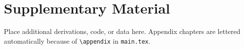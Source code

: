 ﻿%
\chapter{Supplementary Material}
\label{app:supplementary-material}

Place additional derivations, code, or data here. Appendix chapters are
lettered automatically because of \texttt{\textbackslash appendix} in
\texttt{main.tex}.
